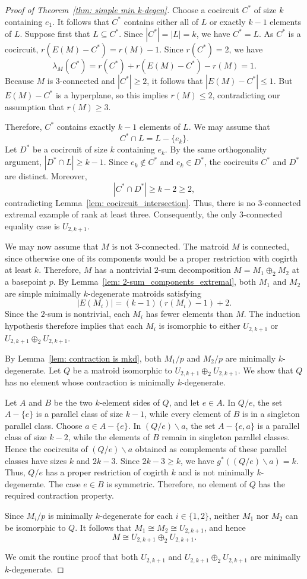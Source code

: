\documentclass{amsart}
\newcommand{\ba}{\backslash}
\theoremstyle{definition}
\theoremstyle{remark}
\numberwithin{equation}{section}
\begin{document}
\begin{proof}[Proof of Theorem~\ref{thm: simple min k-degen}]
Choose a cocircuit $C^*$ of size $k$ containing $e_1$. It follows that $C^*$ contains either all of $L$ or exactly $k-1$ elements of $L$. Suppose first that $L\subseteq C^*$. Since $|C^*|=|L|=k$, we have $C^*=L$. As $C^*$ is a cocircuit, $r(E(M)-C^*)=r(M)-1$. Since $r(C^*)=2$, we have
\[
    \lambda_M(C^*)=r(C^*)+r(E(M)-C^*)-r(M)=1.
\]
Because $M$ is $3$-connected and $|C^*|\geq 2$, it follows that $|E(M)-C^*|\leq 1$. But $E(M)-C^*$ is a hyperplane, so this implies $r(M)\leq 2$, contradicting our assumption that $r(M)\geq 3$.

Therefore, $C^*$ contains exactly $k-1$ elements of $L$. We may assume that
\[
    C^*\cap L=L-\{e_k\}.
\]
Let $D^*$ be a cocircuit of size $k$ containing $e_k$. By the same orthogonality argument, $|D^*\cap L|\geq k-1$. Since $e_k\notin C^*$ and $e_k\in D^*$, the cocircuits $C^*$ and $D^*$ are distinct. Moreover,
\[
    |C^*\cap D^*|\geq k-2\geq 2,
\]
contradicting Lemma~\ref{lem: cocircuit_intersection}. Thus, there is no $3$-connected extremal example of rank at least three. Consequently, the only $3$-connected equality case is $U_{2,k+1}$.

We may now assume that $M$ is not $3$-connected. The matroid $M$ is connected, since otherwise one of its components would be a proper restriction with cogirth at least $k$. Therefore, $M$ has a nontrivial $2$-sum decomposition $M=M_1\oplus_2 M_2$ at a basepoint $p$. By Lemma~\ref{lem: 2-sum_components_extremal}, both $M_1$ and $M_2$ are simple minimally $k$-degenerate matroids satisfying
\[
    |E(M_i)|=(k-1)(r(M_i)-1)+2.
\]
Since the $2$-sum is nontrivial, each $M_i$ has fewer elements than $M$. The induction hypothesis therefore implies that each $M_i$ is isomorphic to either $U_{2,k+1}$ or $U_{2,k+1}\oplus_2 U_{2,k+1}$.

By Lemma~\ref{lem: contraction is mkd}, both $M_1/p$ and $M_2/p$ are minimally $k$-degenerate. Let $Q$ be a matroid isomorphic to $U_{2,k+1}\oplus_2 U_{2,k+1}$. We show that $Q$ has no element whose contraction is minimally $k$-degenerate.

Let $A$ and $B$ be the two $k$-element sides of $Q$, and let $e\in A$. In $Q/e$, the set $A-\{e\}$ is a parallel class of size $k-1$, while every element of $B$ is in a singleton parallel class. Choose $a\in A-\{e\}$. In $(Q/e)\ba a$, the set $A-\{e,a\}$ is a parallel class of size $k-2$, while the elements of $B$ remain in singleton parallel classes. Hence the cocircuits of $(Q/e)\ba a$ obtained as complements of these parallel classes have sizes $k$ and $2k-3$. Since $2k-3\geq k$, we have $g^*((Q/e)\ba a)=k$. Thus, $Q/e$ has a proper restriction of cogirth $k$ and is not minimally $k$-degenerate. The case $e\in B$ is symmetric. Therefore, no element of $Q$ has the required contraction property.

Since $M_i/p$ is minimally $k$-degenerate for each $i\in\{1,2\}$, neither $M_1$ nor $M_2$ can be isomorphic to $Q$. It follows that $M_1\cong M_2\cong U_{2,k+1}$, and hence
\[
    M\cong U_{2,k+1}\oplus_2 U_{2,k+1}.
\]

We omit the routine proof that both $U_{2,k+1}$ and $U_{2,k+1} \oplus_2 U_{2,k+1}$ are minimally $k$-degenerate.
\end{proof}
\end{document}
